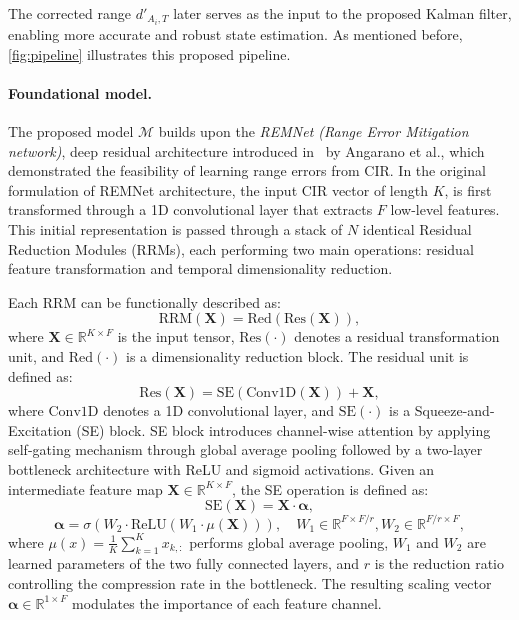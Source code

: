 The corrected range $d'_{A_i,T}$ later serves as the input to the proposed Kalman filter, enabling more accurate and robust state estimation. As mentioned before, \autoref{fig:pipeline} illustrates this proposed pipeline.

\paragraph{Foundational model.}

The proposed model $\mathcal{M}$ builds upon the \emph{REMNet (Range Error Mitigation network)}, deep residual architecture introduced in~\cite{Simone2021UWB} by Angarano et al., which demonstrated the feasibility of learning range errors from CIR. In the original formulation of REMNet architecture, the input CIR vector of length $K$, is first transformed through a 1D convolutional layer that extracts $F$ low-level features. This initial representation is passed through a stack of $N$ identical Residual Reduction Modules (RRMs), each performing two main operations: residual feature transformation and temporal dimensionality reduction.

\newpage

Each RRM can be functionally described as:
\begin{equation}
    \text{RRM}(\mathbf{X}) = \text{Red}(\text{Res}(\mathbf{X})),
\end{equation}
where $\mathbf{X} \in \mathbb{R}^{K \times F}$ is the input tensor, $\text{Res}(\cdot)$ denotes a residual transformation unit, and $\text{Red}(\cdot)$ is a dimensionality reduction block. The residual unit is defined as:
\begin{equation}
    \text{Res}(\mathbf{X}) = \text{SE}(\text{Conv1D}(\mathbf{X})) + \mathbf{X},
\end{equation}
where $\text{Conv1D}$ denotes a 1D convolutional layer, and $\text{SE}(\cdot)$ is a Squeeze-and-Excitation (SE) block. SE block introduces channel-wise attention by applying self-gating mechanism through global average pooling followed by a two-layer bottleneck architecture with ReLU and sigmoid activations.  Given an intermediate feature map $ \mathbf{X} \in \mathbb{R}^{K \times F} $, the SE operation is defined as:
\begin{equation}
    \text{SE}(\mathbf{X}) = \mathbf{X} \cdot \boldsymbol{\alpha},
\end{equation}
\begin{equation}
    \boldsymbol{\alpha} = \sigma\left(W_2 \cdot \text{ReLU}(W_1 \cdot \mu(\mathbf{X}))\right),\quad W_1 \in \mathbb{R}^{F \times F/r}, W_2 \in \mathbb{R}^{F/r \times F},
\end{equation}
where $\mu(x) = \frac{1}{K} \sum_{k=1}^{K} x_{k,:}$ performs global average pooling, $W_1$ and $W_2$ are learned parameters of the two fully connected layers, and $r$ is the reduction ratio controlling the compression rate in the bottleneck. The resulting scaling vector $\boldsymbol{\alpha} \in \mathbb{R}^{1 \times F}$ modulates the importance of each feature channel.

